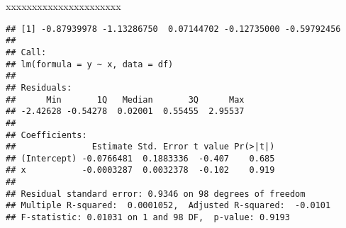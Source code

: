 \documentclass[oneside,svgnames,x11names,x11names,HTML,twoside]{libro-est}\usepackage[]{graphicx}\usepackage[]{color}
\makeatletter
\newenvironment{kframe}{%
 \def\at@end@of@kframe{}%
 \ifinner\ifhmode%
  \def\at@end@of@kframe{\end{minipage}}%
  \begin{minipage}{\columnwidth}%
 \fi\fi%
 \def\FrameCommand##1{\hskip\@totalleftmargin \hskip-\fboxsep
 \colorbox{shadecolor}{##1}\hskip-\fboxsep
     \hskip-\linewidth \hskip-\@totalleftmargin \hskip\columnwidth}%
 \MakeFramed {\advance\hsize-\width
   \@totalleftmargin\z@ \linewidth\hsize
   \@setminipage}}%
 {\par\unskip\endMakeFramed%
 \at@end@of@kframe}
\newenvironment{knitrout}{}{} %
\makeatother
\begin{document}
xxxxxxxxxxxxxxxxxxxxxx\\
\begin{knitrout}
\color{fgcolor}\begin{kframe}
\begin{verbatim}
## [1] -0.87939978 -1.13286750  0.07144702 -0.12735000 -0.59792456
## 
## Call:
## lm(formula = y ~ x, data = df)
## 
## Residuals:
##      Min       1Q   Median       3Q      Max 
## -2.42628 -0.54278  0.02001  0.55455  2.95537 
## 
## Coefficients:
##               Estimate Std. Error t value Pr(>|t|)
## (Intercept) -0.0766481  0.1883336  -0.407    0.685
## x           -0.0003287  0.0032378  -0.102    0.919
## 
## Residual standard error: 0.9346 on 98 degrees of freedom
## Multiple R-squared:  0.0001052,	Adjusted R-squared:  -0.0101 
## F-statistic: 0.01031 on 1 and 98 DF,  p-value: 0.9193
\end{verbatim}
\end{kframe}
\end{knitrout}
\end{document}
